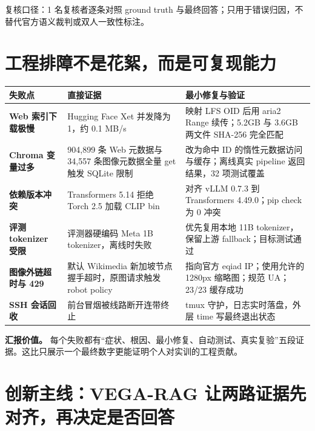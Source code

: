 \documentclass[11pt,a4paper]{ctexart}
\begin{document}
\small\color{Muted}
复核口径：1 名复核者逐条对照 ground truth 与最终回答；只用于错误归因，不替代官方语义裁判或双人一致性标注。
\clearpage

\section{工程排障不是花絮，而是可复现能力}

\begin{longtable}{>{\bfseries}p{28mm} p{55mm} p{78mm}}
\toprule
失败点 & 直接证据 & 最小修复与验证 \\
\midrule
\endhead
Web 索引下载极慢 & Hugging Face Xet 并发降为 1，约 0.1 MB/s & 映射 LFS OID 后用 aria2 Range 续传；5.2GB 与 3.6GB 两文件 SHA-256 完全匹配 \\
Chroma 变量过多 & 904,899 条 Web 元数据与 34,557 条图像元数据全量 get 触发 SQLite 限制 & 改为命中 ID 的惰性元数据访问与缓存；离线真实 pipeline 返回结果，32 项测试覆盖 \\
依赖版本冲突 & Transformers 5.14 拒绝 Torch 2.5 加载 CLIP bin & 对齐 vLLM 0.7.3 到 Transformers 4.49.0；pip check 为 0 冲突 \\
评测 tokenizer 受限 & 评测器硬编码 Meta 1B tokenizer，离线时失败 & 优先复用本地 11B tokenizer，保留上游 fallback；目标测试通过 \\
图像外链超时与 429 & 默认 Wikimedia 新加坡节点握手超时，原图请求触发 robot policy & 指向官方 eqiad IP；使用允许的 1280px 缩略图；规范 UA；23/23 缓存成功 \\
SSH 会话回收 & 前台冒烟被线路断开连带终止 & tmux 守护，日志实时落盘，外层 time 写最终退出状态 \\
\bottomrule
\end{longtable}

\begin{callout}
\textbf{汇报价值。} 每个失败都有“症状、根因、最小修复、自动测试、真实复验”五段证据。这比只展示一个最终数字更能证明个人对实训的工程贡献。
\end{callout}
\clearpage

\section{创新主线：VEGA-RAG 让两路证据先对齐，再决定是否回答}
\end{document}
